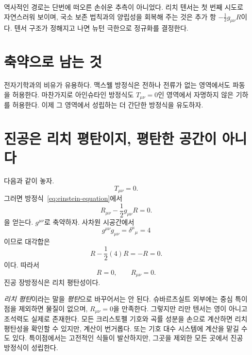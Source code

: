 역사적인 경로는 단번에 떠오른 손쉬운 추측이 아니었다. 리치 텐서는 첫 번째 시도로 자연스러워 보이며, 국소 보존 법칙과의 양립성을 회복해 주는 것은 추가 항 \(-\tfrac12g_{\mu\nu}R\)이다. 텐서 구조가 정해지고 나면 뉴턴 극한으로 정규화를 결정한다.

\section{축약으로 남는 것}

\begin{classroomqa}
\end{classroomqa}

전자기학과의 비유가 유용하다. 맥스웰 방정식은 전하나 전류가 없는 영역에서도 파동을 허용한다. 마찬가지로 아인슈타인 방정식도 \(T_{\mu\nu}=0\)인 영역에서 자명하지 않은 기하를 허용한다. 이제 그 영역에서 성립하는 더 간단한 방정식을 유도하자.

\section{진공은 리치 평탄이지, 평탄한 공간이 아니다}

다음과 같이 놓자.
\begin{equation}
 T_{\mu\nu}=0.
\end{equation}
그러면 방정식~\eqref{eq:einstein-equation}에서
\begin{equation}
 R_{\mu\nu}-\frac12g_{\mu\nu}R=0.
 \label{eq:vacuum-einstein}
\end{equation}
을 얻는다. \(g^{\mu\nu}\)로 축약하자. 사차원 시공간에서
\begin{equation}
 g^{\mu\nu}g_{\mu\nu}
 =\delta^\mu{}_\mu=4
\end{equation}
이므로 대각합은
\begin{equation}
 R-\frac12(4)R=-R=0.
\end{equation}
이다. 따라서
\begin{equation}
 R=0,
 \qquad
 R_{\mu\nu}=0.
 \label{eq:ricci-flat}
\end{equation}
진공 장방정식은 리치 평탄성이다.

\emph{리치 평탄}이라는 말을 \emph{평탄}으로 바꾸어서는 안 된다. 슈바르츠실트 외부에는 중심 특이점을 제외하면 물질이 없으며, \(R_{\mu\nu}=0\)을 만족한다. 그렇지만 리만 텐서는 영이 아니고 조석력도 실제로 존재한다. 모든 크리스토펠 기호와 곡률 성분을 손으로 계산하면 리치 평탄성을 확인할 수 있지만, 계산이 번거롭다. 또는 기호 대수 시스템에 계산을 맡길 수도 있다. 특이점에서는 고전적인 식들이 발산하지만, 그곳을 제외한 모든 곳에서 진공 방정식이 성립한다.

